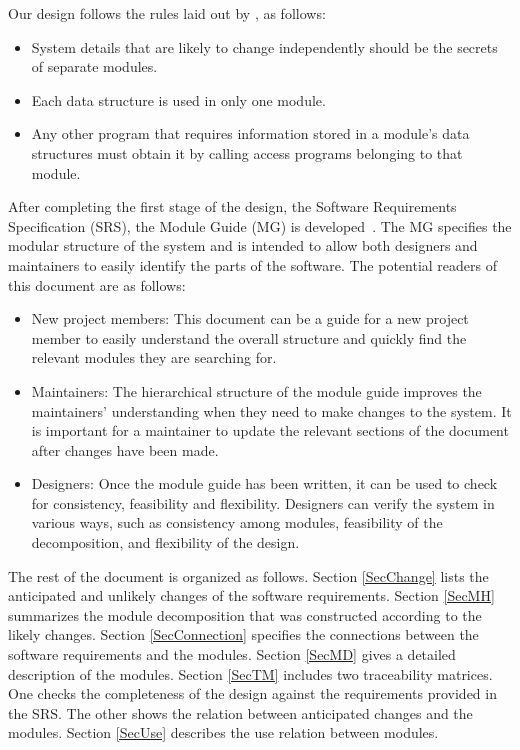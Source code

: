 \documentclass[12pt, titlepage]{article}
\begin{document}
Our design follows the rules laid out by \citet{ParnasEtAl1984}, as follows:
\begin{itemize}
\item System details that are likely to change independently should be the
  secrets of separate modules.
\item Each data structure is used in only one module.
\item Any other program that requires information stored in a module's data
  structures must obtain it by calling access programs belonging to that module.
\end{itemize}

After completing the first stage of the design, the Software Requirements
Specification (SRS), the Module Guide (MG) is developed~\citep{ParnasEtAl1984}.
The MG specifies the modular structure of the system and is intended to allow 
both designers and maintainers to easily identify the parts of the software. 
The potential readers of this document are as follows:

\begin{itemize}
\item New project members: This document can be a guide for a new project
  member to easily understand the overall structure and quickly find the
  relevant modules they are searching for.
\item Maintainers: The hierarchical structure of the module guide improves the
  maintainers' understanding when they need to make changes to the system. It 
  is important for a maintainer to update the relevant sections of the document
  after changes have been made.
\item Designers: Once the module guide has been written, it can be used to
  check for consistency, feasibility and flexibility. Designers can verify the
  system in various ways, such as consistency among modules, feasibility of the
  decomposition, and flexibility of the design.
\end{itemize}

The rest of the document is organized as follows. Section
\ref{SecChange} lists the anticipated and unlikely changes of the software
requirements. Section \ref{SecMH} summarizes the module decomposition that
was constructed according to the likely changes. Section \ref{SecConnection}
specifies the connections between the software requirements and the
modules. Section \ref{SecMD} gives a detailed description of the
modules. Section \ref{SecTM} includes two traceability matrices. One checks
the completeness of the design against the requirements provided in the SRS. 
The other shows the relation between anticipated changes and the modules. 
Section \ref{SecUse} describes the use relation between modules.
\end{document}
